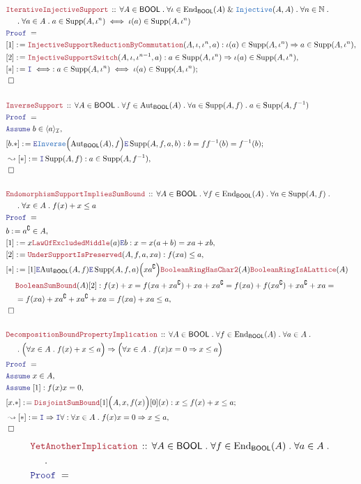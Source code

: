 \documentclass[12pt]{scrartcl}
\newcommand{\TYPE}[1]{\textcolor{NavyBlue}{\mathtt{#1}}}
\newcommand{\LOGIC}[1]{\textcolor{Blue}{\mathtt{#1}}}
\newcommand{\THM}[1]{\textcolor{Maroon}{\mathtt{#1}}}
\renewcommand{\.}{\; . \;}
\newcommand{\de}{: \kern 0.1pc =}
\newcommand{\Theorem}[2]{& \THM{#1} \, :: \, #2 \\ & \Proof = \\ }
\newcommand{\NewLine}{\\ & \kern 1pc}
\newcommand{\Page}[1]{ \begin{align*} #1 \end{align*}   }
\renewcommand{\And}{\; \& \;}
\newcommand{\Imply}{\Rightarrow}
\newcommand{\Intro}{\LOGIC{I}}
\newcommand{\Elim}{\LOGIC{E}}
\newcommand{\Nat}{\mathbb{N} }
\newcommand{\End}{\mathrm{End}}
\newcommand{\Aut}{\mathrm{Aut}}
\newcommand{\Inj}{\TYPE{Injective}}
\renewcommand{\c}{\complement}
\newcommand{\Say}[3]{& #1 \de #2 : #3, \\}
\newcommand{\SayIn}[3]{& #1 \de #2 \in #3, \\}
\newcommand{\Conclude}[3]{& #1 \de #2 : #3; \\}
\newcommand{\Derive}[3]{& \leadsto #1 \de #2 : #3, \\}
\newcommand{\Assume}[2]{& \LOGIC{Assume} \; #1 : #2, \\}
\newcommand{\AssumeIn}[2]{& \LOGIC{Assume} \; #1 \in #2, \\}
\newcommand{\QED}{\; \square}
\newcommand{\EndProof}{& \QED \\}
\newcommand{\Proof}{\LOGIC{Proof} \; }
\newcommand{\I}{\mathcal{I}}
\DeclareMathOperator{\Supp}{Supp}
\newcommand{\BOOL}{\mathsf{BOOL}}
\begin{document}
\Page{
	\Theorem{IterativeInjectiveSupport}
	{
		\forall A \in \BOOL \.
		\forall \iota \in \End_\BOOL(A) \And \Inj(A,A) \.
		\forall n \in \Nat \.	
		\NewLine \.
		\forall a \in A \.
		a \in \Supp(A,\iota^n)
		\iff
		\iota(a) \in \Supp(A,\iota^n)
	}
	\Say{[1]}
	{
		\THM{InjectiveSupportReductionByCommutation}(A,\iota,\iota^n,a)
	}
	{
		\iota(a) \in \Supp(A,\iota^n)
		\Imply
		a \in \Supp(A,\iota^n)
	}
	\Say{[2]}
	{
		\THM{InjectiveSupportSwitch}(A,\iota,\iota^{n-1},a)
	}
	{
		a \in \Supp(A,\iota^n)
		\Imply
		\iota(a) \in \Supp(A,\iota^n)
	}
	\Conclude{[*]}{\Intro \iff}
	{
		a \in \Supp(A,\iota^n)
		\iff
		\iota(a) \in \Supp(A,\iota^n)
	}
	\EndProof
	\\
	\Theorem{InverseSupport}
	{
		\forall A \in \BOOL \.
		\forall f \in \Aut_\BOOL(A) \.
		\forall a \in \Supp(A,f) \.
		a \in \Supp(A,f^{-1})
	}
	\AssumeIn{b}{\langle a \rangle_\I}
	\Conclude{[b.*]}
	{
		\Elim \TYPE{Inverse}\Big( \Aut_\BOOL(A), f \Big)
		\Elim \Supp(A,f,a,b)	
	}
	{
		b = 
		ff^{-1}(b) = 
		f^{-1}(b) 
	}
	\Derive{[*]}{\Intro \Supp(A,f)}
	{
		a \in \Supp(A,f^{-1})
	}
	\EndProof
	\\
	\Theorem{EndomorphismSupportImpliesSumBound}
	{
		\forall A \in \BOOL \.
		\forall f \in \End_\BOOL(A) \.
		\forall a \in \Supp(A,f) \. \NewLine \.
		\forall x \in A  \.
		f(x) + x \le a
 	}
 	\SayIn{b}{a^\c}{A}
 	\Say{[1]}{x\THM{LawOfExcludedMiddle}(a)\Elim b}
 	{
 		x = x(a + b) = xa + xb
 	}
 	\Say{[2]}{\THM{UnderSupportIsPreserved}(A,f,a,xa)}
 	{
 		f(xa) \le a
 	}
 	\Say{[*]}
 	{
 		[1]
 		\Elim \Aut_\BOOL(A,f) 
 		\Elim \Supp(A,f,a)\Big(xa^\c\Big)
 		\THM{BooleanRingHasChar2}(A)
 		\THM{BooleanRingIsALattice}(A) 
 		\NewLine
 		\THM{BooleanSumBound}(A)[2]
 	}
 	{
 		f(x) + x  = 
 		f(xa +xa^\c) +  xa +xa^\c = 
 		f(xa) + f(xa^\c) + xa^\c + xa  = \NewLine =
 		f(xa) + xa^\c + xa^\c + xa  = 
 		f(xa)  + xa \le  a
 	}
 	\EndProof
 	\\
 	\Theorem{DecompositionBoundPropertyImplication}
 	{
 		\forall A \in \BOOL \.
 		\forall f \in \End_\BOOL(A) \.
 		\forall a \in A \.
 		\NewLine \.
 		\Big(  \forall x \in A \.  f(x) + x \le a     \Big) 
 		\Imply
 		\Big( \forall x \in A \. f(x)x = 0 \Imply x \le a \Big)
 	}
 	\AssumeIn{x}{A}
 	\Assume{[1]}{f(x)x = 0}
 	\Conclude{[x.*]}{\THM{DisjointSumBound}[1]\Big(A,x,f(x)\Big)[0](x)}
 	{
 		x \le f(x) + x \le a
 	}
 	\Derive{[*]}{\Intro \Imply \Intro \forall}
 	{
 		\forall x \in A \. f(x)x = 0 \Imply x \le a
 	}
 	\EndProof
}\Page{
 	\Theorem{YetAnotherImplication}
 	{
 		\forall A \in \BOOL \.
 		\forall f \in \End_\BOOL(A) \.
 		\forall a \in A \.
 		\NewLine \.
}}
\end{document}
